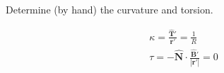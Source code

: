 Determine (by hand) the curvature and torsion.

\begin{solution}
\begin{align*}
    \kappa = \frac{\boldsymbol{\hat{T}'}}{\boldsymbol{r'}} = \frac{1}{R} \\
    \tau = -\boldsymbol{\hat{N}} \cdot \frac{\boldsymbol{\hat{B}'}}{|\boldsymbol{r'}|} = 0
\end{align*}
\end{solution}